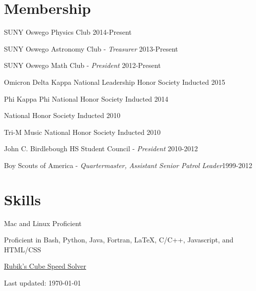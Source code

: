 \documentclass[8pt]{article}
\def\footerlink{}
\renewenvironment{itemize}{
  \begin{list}{}{
    \setlength{\leftmargin}{1.5em}
  }
}{
  \end{list}
}
\begin{document}
\section*{Membership}
\begin{itemize}
\item SUNY Oswego Physics Club \hfill 2014-Present
\item SUNY Oswego Astronomy Club - \emph{Treasurer} \hfill 2013-Present
\item SUNY Oswego Math Club - \emph{President} \hfill 2012-Present
\item Omicron Delta Kappa National Leadership Honor Society \hfill Inducted 2015
\item Phi Kappa Phi National Honor Society \hfill Inducted 2014
\item National Honor Society \hfill Inducted 2010
\item Tri-M Music National Honor Society \hfill Inducted 2010
\item John C. Birdlebough HS Student Council - \emph{President} \hfill 2010-2012
\item Boy Scouts of America - \emph{Quartermaster, Assistant Senior Patrol Leader}\hfill 1999-2012
\end{itemize}

\section*{Skills}
\begin{itemize}
\item Mac and Linux Proficient
\item Proficient in Bash, Python, Java, Fortran, {\LaTeX}, C/C++, Javascript, and HTML/CSS
\item \href{https://youtu.be/qPBg2xok04s}{Rubik's Cube Speed Solver}
\end{itemize}

\bigskip

\begin{center}
  \begin{footnotesize}
    Last updated: \today \\
    \href{\footerlink}{\texttt{\footerlink}}
  \end{footnotesize}
\end{center}
\end{document}

